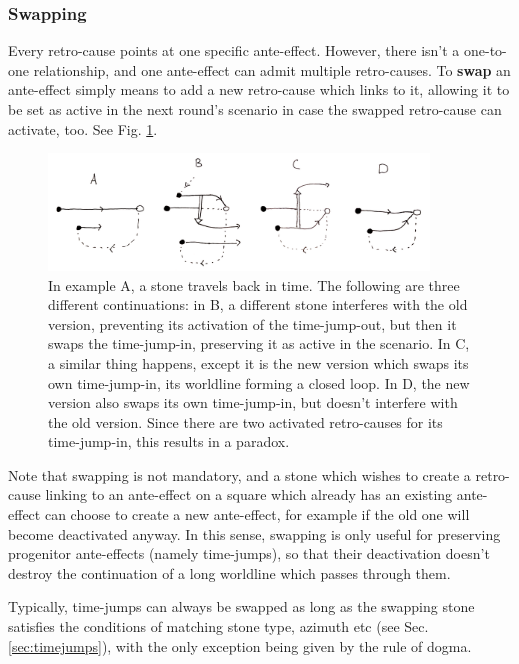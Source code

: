 \documentclass[12pt]{article}
\begin{document}
	
	\subsubsection{Swapping}\label{sec:swapping}
	Every retro-cause points at one specific ante-effect. However, there isn't a one-to-one relationship, and one ante-effect can admit multiple retro-causes. To \textbf{swap} an ante-effect simply means to add a new retro-cause which links to it, allowing it to be set as active in the next round's scenario in case the swapped retro-cause can activate, too. See Fig. \ref{fig:swapping}.
	
	\begin{figure}[h]
\begin{center}
    \includegraphics[width=0.9\textwidth]{images/diag_swapping}
 \caption{In example A, a stone travels back in time. The following are three different continuations: in B, a different stone interferes with the old version, preventing its activation of the time-jump-out, but then it swaps the time-jump-in, preserving it as active in the scenario. In C, a similar thing happens, except it is the new version which swaps its own time-jump-in, its worldline forming a closed loop. In D, the new version also swaps its own time-jump-in, but doesn't interfere with the old version. Since there are two activated retro-causes for its time-jump-in, this results in a paradox.}\label{fig:swapping}
\end{center}
\end{figure}

Note that swapping is not mandatory, and a stone which wishes to create a retro-cause linking to an ante-effect on a square which already has an existing ante-effect can choose to create a new ante-effect, for example if the old one will become deactivated anyway. In this sense, swapping is only useful for preserving progenitor ante-effects (namely time-jumps), so that their deactivation doesn't destroy the continuation of a long worldline which passes through them.

	Typically, time-jumps can always be swapped as long as the swapping stone satisfies the conditions of matching stone type, azimuth etc (see Sec. \ref{sec:timejumps}), with the only exception being given by the rule of dogma.
	
\end{document}
